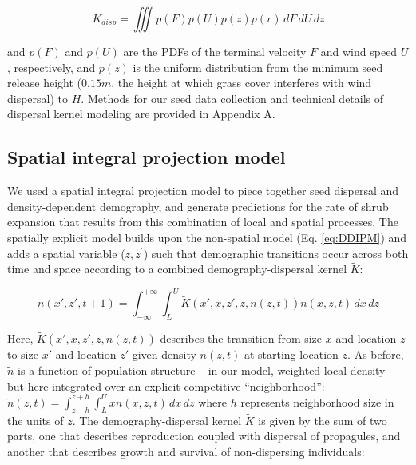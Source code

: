 \documentclass[11pt]{article}\usepackage[]{graphicx}\usepackage[usenames,dvipsnames]{xcolor}
\begin{document}
\begin{linenomath*} \label{eq:Kd}
\begin{equation} K_{disp} = \iiint p(F)p(U)p(z)p(r) \,dF\,dU\,dz \end{equation} 
\end{linenomath*} 

and $p(F)$ and $p(U)$ are the PDFs of the terminal velocity $F$ and wind speed $U$, respectively, and $p(z)$ is the uniform distribution from the minimum seed release height ($0.15m$, the height at which grass cover interferes with wind dispersal) to $H$.
Methods for our seed data collection and technical details of dispersal kernel modeling are provided in Appendix A. 

\subsection*{Spatial integral projection model}

We used a spatial integral projection model to piece together seed dispersal and density-dependent demography, and generate predictions for the rate of shrub expansion that results from this combination of local and spatial processes. 
The spatially explicit model builds upon the non-spatial model (Eq. \ref{eq:DDIPM}) and adds a spatial variable ($z,z^\prime$) such that demographic transitions occur across both time and space according to a combined demography-dispersal kernel $\tilde{K}$:

\begin{linenomath*} 
\begin{equation} \label{eq:SIPM}
n(x\prime,z\prime,t + 1) = \int_{-\infty}^{+\infty} \int_{L}^{U} \tilde{K}(x\prime,x,z\prime,z,\tilde{n}(z,t)) n(x,z,t) \,dx \,dz 
\end{equation} 
\end{linenomath*}

Here, $\tilde{K}(x\prime,x,z\prime,z,\tilde{n}(z,t))$ describes the transition from size $x$ and location $z$ to size $x\prime$ and location $z\prime$ given density $\tilde{n}(z,t)$ at starting location $z$.
As before, $\tilde{n}$ is a function of population structure -- in our model, weighted local density -- but here integrated over an explicit competitive ``neighborhood'': 
$\tilde{n}(z,t)=\int_{z-h}^{z+h} \int_{L}^{U} x n(x,z,t) \,dx \,dz$
where $h$ represents neighborhood size in the units of $z$.
The demography-dispersal kernel $\tilde{K}$ is given by the sum of two parts, one that describes reproduction coupled with dispersal of propagules, and another that describes growth and survival of non-dispersing individuals:
\end{document}

